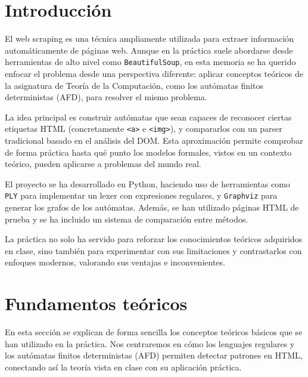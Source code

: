 \documentclass[11pt,a4paper]{article}
\begin{document}
\vspace{2.5em}

\section{Introducción}

El web scraping es una técnica ampliamente utilizada para extraer información automáticamente de páginas web. Aunque en la práctica suele abordarse desde herramientas de alto nivel como \texttt{BeautifulSoup}, en esta memoria se ha querido enfocar el problema desde una perspectiva diferente: aplicar conceptos teóricos de la asignatura de Teoría de la Computación, como los autómatas finitos deterministas (AFD), para resolver el mismo problema.

\medskip

La idea principal es construir autómatas que sean capaces de reconocer ciertas etiquetas HTML (concretamente \texttt{<a>} e \texttt{<img>}), y compararlos con un parser tradicional basado en el análisis del DOM. Esta aproximación permite comprobar de forma práctica hasta qué punto los modelos formales, vistos en un contexto teórico, pueden aplicarse a problemas del mundo real.

\medskip

El proyecto se ha desarrollado en Python, haciendo uso de herramientas como \texttt{PLY} para implementar un lexer con expresiones regulares, y \texttt{Graphviz} para generar los grafos de los autómatas. Además, se han utilizado páginas HTML de prueba y se ha incluido un sistema de comparación entre métodos.

\medskip

La práctica no solo ha servido para reforzar los conocimientos teóricos adquiridos en clase, sino también para experimentar con sus limitaciones y contrastarlos con enfoques modernos, valorando sus ventajas e inconvenientes.

\section{Fundamentos teóricos}

En esta sección se explican de forma sencilla los conceptos teóricos básicos que se han utilizado en la práctica. Nos centraremos en cómo los lenguajes regulares y los autómatas finitos deterministas (AFD) permiten detectar patrones en HTML, conectando así la teoría vista en clase con su aplicación práctica.
\end{document}
